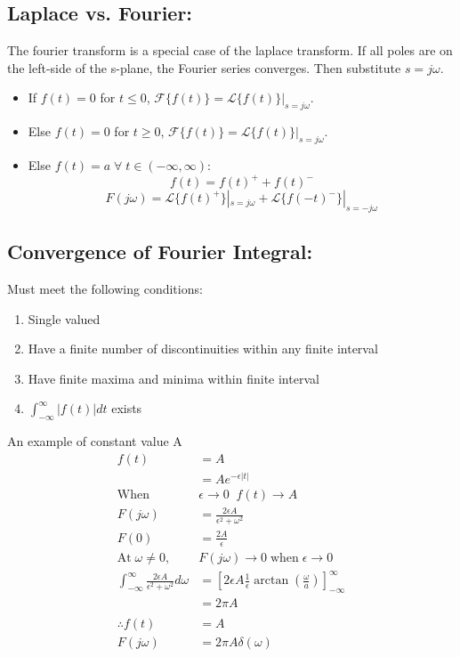 \documentclass[a5paper]{article}
\newcommand{\Lap}{\mathcal{L}}
\newcommand{\For}{\mathcal{F}}
\begin{document}
	\subsection{Laplace vs. Fourier:}
	The fourier transform is a special case of the laplace transform. If all poles are on the left-side of the s-plane, the Fourier series converges. Then substitute $s=j\omega$.
	\begin{itemize}
		\item If $f(t)=0$ for $t\leq0$, $\For\{f(t)\}=\Lap\{f(t)\}|_{s=j\omega}$.
		\item Else $f(t)=0$ for $t\geq0$, $\For\{f(t)\}=\Lap\{f(t)\}|_{s=j\omega}$.
		\item Else $f(t)=a\;\forall\;t\in(-\infty,\infty)$:
			$$f(t)=f(t)^{+}+f(t)^{-}$$
			$$F(j\omega)=\Lap\{f(t)^{+}\}|_{s=j\omega}+\Lap\{f(-t)^{-}\}|_{s=-j\omega}$$
	\end{itemize}
	\subsection{Convergence of Fourier Integral:}
	Must meet the following conditions:
	\begin{enumerate}
		\item Single valued
		\item Have a finite number of discontinuities within any finite interval
		\item Have finite maxima and minima within finite interval
		\item $\int^{\infty}_{-\infty}|f(t)|dt$ exists
	\end{enumerate}
	An example of constant value A
	\begin{align*}
		f(t)&=A\\
		&=Ae^{-\epsilon|t|}\\
		\text{When}\;&\epsilon\to0\;\;f(t)\to A\\
		F(j\omega)&=\frac{2\epsilon A}{\epsilon^{2}+\omega^{2}}\\
		F(0)&=\frac{2A}{\epsilon}\\
		\text{At}\;\omega\neq0,\;& F(j\omega)\to0\;\text{when}\;\epsilon\to0\\
		\int^{\infty}_{-\infty}\frac{2\epsilon A}{\epsilon^{2}+\omega^{2}}d\omega&=\left[2\epsilon A\frac{1}{\epsilon}\arctan{\left(\frac{\omega}{a}\right)}\right]^{\infty}_{-\infty}\\
		&=2\pi A\\\\
		\therefore f(t)&=A\\
		F(j\omega)&=2\pi A\delta(\omega)
	\end{align*}
\end{document}
